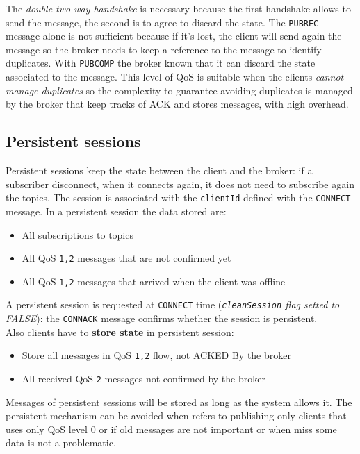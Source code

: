 \documentclass[10pt,a4paper]{report}
\theoremstyle{definition}
\begin{document}
The \textit{double two-way handshake} is necessary because the first handshake allows to send the message, the second is to agree to discard the state. The \texttt{PUBREC} message alone is not sufficient because if it's lost, the client will send again the message so the broker needs to keep a reference to the message to identify duplicates. With \texttt{PUBCOMP} the broker known that it can discard the state associated to the message.
This level of QoS is suitable when the clients \textit{cannot manage duplicates} so the complexity to guarantee avoiding duplicates is managed by the broker that keep tracks of ACK and stores messages, with high overhead.
\subsection{Persistent sessions}\label{sec:persistent-sessions}
Persistent sessions keep the state between the client and the broker: if a subscriber disconnect, when it connects again, it does not need to subscribe again the topics. The session is associated with the \texttt{clientId} defined with the \texttt{CONNECT} message.
In a persistent session the data stored are:
\begin{itemize}
	\item 
	All subscriptions to topics
	\item 
	All QoS \texttt{1,2} messages that are not confirmed yet
	\item 
	All QoS \texttt{1,2} messages that arrived when the client was offline
\end{itemize}
A persistent session is requested at \texttt{CONNECT} time (\textit{\texttt{cleanSession} flag setted to FALSE}): the \texttt{CONNACK} message confirms whether the session is persistent.\\
Also clients have to \textbf{store state} in persistent session:
\begin{itemize}
	\item 
	Store all messages in QoS \texttt{1,2} flow, not ACKED By the broker
	\item 
	All received QoS \texttt{2} messages not confirmed by the broker
	
\end{itemize}
Messages of persistent sessions will be stored as long as the system allows it. The persistent mechanism can be avoided when refers to publishing-only clients that uses only QoS level 0 or if old messages are not important or when miss some data is not a problematic.
\end{document}
